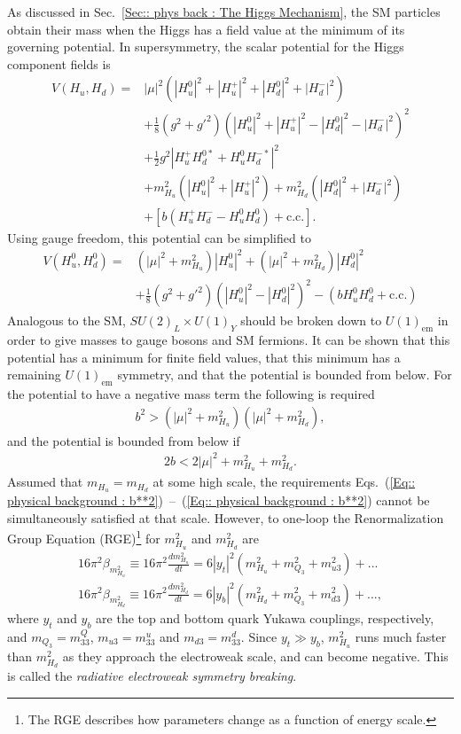 \documentclass[twoside,english]{uiofysmaster}
\begin{document}
{As discussed in Sec.~\ref{Sec:: phys back : The Higgs Mechanism}, the SM particles obtain their mass when the Higgs has a field value at the minimum of its governing potential. In supersymmetry, the scalar potential for the Higgs component fields is
\begin{align}
V(H_u, H_d) =& |\mu|^2 (|H_u^0|^2 + |H_u^+|^2 + |H_d^0|^2 + |H_d^-|^2) \nonumber \\
&+ \frac{1}{8} (g^2+{g'}^2)(|H_u^0|^2 + |H_u^+|^2 - |H_d^0|^2 - |H_d^-|^2)^2 \nonumber \\
&+ \frac{1}{2} g^2 |H_u^+H_d^{0*} + H_u^0H_d^{-*}|^2 \nonumber \\
&+ m_{H_u}^2 (|H_u^0|^2 + |H_u^+|^2) + m_{H_d}^2 (|H_d^0|^2 + |H_d^-|^2) \nonumber \\
&+ [b (H_u^+H_d^- - H_u^0 H_d^0) + \text{c.c.}].
\end{align}
Using gauge freedom, this potential can be simplified to 
\begin{align}
V(H_u^0, H_d^0) =& (|\mu|^2 + m_{H_u}^2) |H_u^0|^2 + (|\mu|^2 + m_{H_d}^2)|H_d^0|^2 \nonumber \\
&+ \frac{1}{8}(g^2 + {g'}^2)(|H_u^0|^2 - |H_d^0|^2)^2 - (bH_u^0 H_d^0 + \text{c.c.})
\end{align}
Analogous to the SM, $SU(2)_L \times U(1)_Y$ should be broken down to $U(1)_{\mathrm{em}}$ in order to give masses to gauge bosons and SM fermions. It can be shown that this potential has a minimum for finite field values, that this minimum has a remaining $U(1)_{\mathrm{em}}$ symmetry, and that the potential is bounded from below. For the potential to have a negative mass term the following is required
\begin{align}\label{Eq:: physical background : b**2}
b^2 > (|\mu|^2 + m_{H_u}^2)(|\mu|^2 + m_{H_d}^2),
\end{align}
and the potential is bounded from below if
\begin{align}\label{Eq:: physical background : 2b}
2b < 2 |\mu|^2 + m_{H_u}^2 + m^2_{H_d}.
\end{align}
Assumed that $m_{H_u} = m_{H_d}$ at some high scale,  the requirements Eqs.~(\ref{Eq:: physical background : b**2})~--~(\ref{Eq:: physical background : b**2}) cannot be simultaneously satisfied at that scale. However, to one-loop the Renormalization Group Equation (RGE)\footnote{The RGE describes how parameters change as a function of energy scale.} for $m_{H_u}^2$ and $m_{H_d}^2$ are 
\begin{align}
16 \pi^2\beta_{m_{H_u}^2} \equiv 16 \pi^2 \frac{d m_{H_u}^2}{dt} = 6 |y_t|^2(m_{H_u}^2 + m_{Q_3}^2 + m_{u3}^2) +...\\
16 \pi^2\beta_{m_{H_d}^2} \equiv 16 \pi^2 \frac{d m_{H_d}^2}{dt} = 6 |y_b|^2(m_{H_d}^2 + m_{Q_3}^2 + m_{d3}^2) +...,
\end{align} 
where $y_t$ and $y_b$ are the top and bottom quark Yukawa couplings, respectively, and $m_{Q_3} = m_{33}^Q$, $m_{u3}= m_{33}^u$ and $m_{d3} = m_{33}^d$. Since $y_t \gg y_b$, $m_{H_u}^2$ runs much faster than $m_{H_d}^2$ as they approach the electroweak scale, and can become negative. This is called the \textit{radiative electroweak symmetry breaking}.

}
\end{document}
